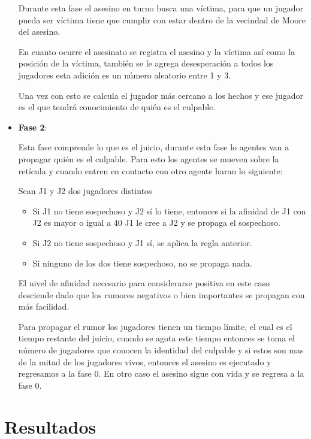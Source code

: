\documentclass[11pt,letterpaper]{article}
\begin{document}
\begin{itemize}
	Durante esta fase el asesino en turno busca una víctima, para que un jugador 
	pueda ser víctima tiene que cumplir con estar dentro de la vecindad de Moore del
	asesino.
	
	En cuanto ocurre el asesinato se registra el asesino y la víctima así como la
	posición de la víctima, también se le agrega desesperación a todos los jugadores
	esta adición es un número aleatorio entre 1 y 3.
	
	Una vez con esto se calcula el jugador más cercano a los hechos y ese jugador
	es el que tendrá conocimiento de quién es el culpable.
	
	\item {\large \textbf{Fase 2}}:
	
	Esta fase comprende lo que es el juicio, durante esta fase lo agentes van a propagar quién es el culpable. Para esto los agentes se mueven sobre la retícula
	y cuando entren en contacto con otro agente haran lo siguiente:
	
	Sean J1 y J2 dos jugadores distintos
	\begin{itemize}
		\item Si J1 no tiene sospechoso y J2 sí lo tiene, entonces si la afinidad 
		de J1 con J2 es mayor o igual a 40 J1 le cree a J2 y se propaga el sospechoso.
		\item Si J2 no tiene sospechoso y J1 sí, se aplica la regla anterior.
		\item Si ninguno de los dos tiene sospechoso, no se propaga nada.
	\end{itemize}

	El nivel de afinidad necesario para considerarse positiva en este caso desciende
	dado que los rumores negativos o bien importantes se propagan con más facilidad.
	
	Para propagar el rumor los jugadores tienen un tiempo límite, el cual es el 
	tiempo restante del juicio, cuando se agota este tiempo entonces se toma el
	número de jugadores que conocen la identidad del culpable y si estos son mas
	de la mitad de los jugadores vivos, entonces el asesino es ejecutado y
	regresamos a la fase 0. En otro caso el asesino sigue con vida y se regresa
	a la fase 0. 
\end{itemize}

\section{Resultados}
\end{document}
